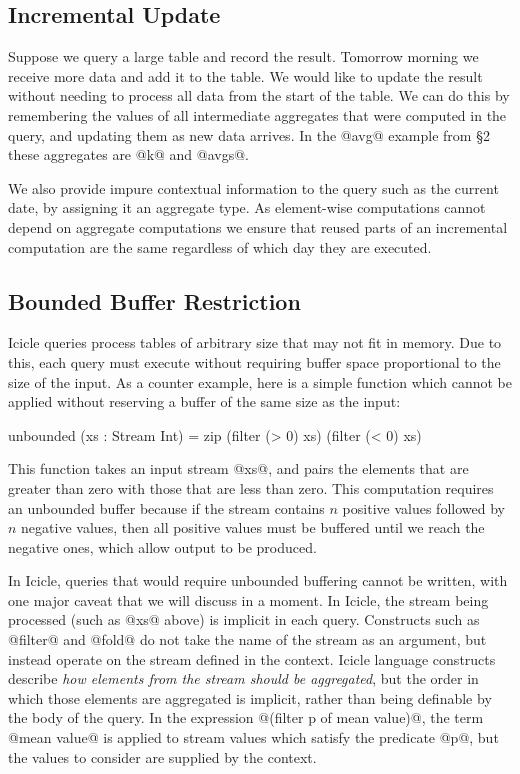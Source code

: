 \subsection{Incremental Update}
Suppose we query a large table and record the result. Tomorrow morning we receive more data and add it to the table. We would like to update the result without needing to process all data from the start of the table. We can do this by remembering the values of all intermediate aggregates that were computed in the query, and updating them as new data arrives. In the @avg@ example from \S2 these aggregates are @k@ and @avgs@. 

We also provide impure contextual information to the query such as the current date, by assigning it an aggregate type. As element-wise computations cannot depend on aggregate computations we ensure that reused parts of an incremental computation are the same regardless of which day they are executed.


\subsection{Bounded Buffer Restriction}
\label{s:IcicleSource:bounded}
Icicle queries process tables of arbitrary size that may not fit in memory. Due to this, each query must execute without requiring buffer space proportional to the size of the input. As a counter example, here is a simple function which cannot be applied without reserving a buffer of the same size as the input:
\begin{code}
    unbounded (xs : Stream Int)
     = zip (filter (> 0) xs) (filter (< 0) xs)
\end{code}

This function takes an input stream @xs@, and pairs the elements that are greater than zero with those that are less than zero.
This computation requires an unbounded buffer because if the stream contains $n$ positive values followed by $n$ negative values, then all positive values must be buffered until we reach the negative ones, which allow output to be produced.

In Icicle, queries that would require unbounded buffering cannot be written, with one major caveat that we will discuss in a moment. In Icicle, the stream being processed (such as @xs@ above) is implicit in each query. Constructs such as @filter@ and @fold@ do not take the name of the stream as an argument, but instead operate on the stream defined in the context. Icicle language constructs describe \emph{how elements from the stream should be aggregated}, but the order in which those elements are aggregated is implicit, rather than being definable by the body of the query. In the expression @(filter p of mean value)@, the term @mean value@ is applied to stream values which satisfy the predicate @p@, but the values to consider are supplied by the context.


